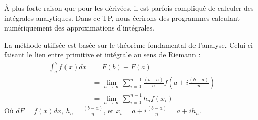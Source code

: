 
À plus forte raison que pour les dérivées, il est parfois compliqué de calculer
des intégrales analytiques. Dans ce TP, nous écrirons des programmes
calculant numériquement des approximations d'intégrales.

La méthode utilisée est basée sur le théorème fondamental de l'analyse.
Celui-ci faisant le lien entre primitive et intégrale au sens de Riemann :
\begin{equation}
\begin{split}
\int_a^b f(x)dx &= F(b)-F(a) \\
                &= \lim_{n\rightarrow\infty} \sum_{i=0}^{n-1}\frac{(b-a)}{n} f(a+i\frac{(b-a)}{n})\\
                &= \lim_{n\rightarrow\infty} \sum_{i=0}^{n-1} h_n f(x_i)
\end{split}
\end{equation}
Où $dF = f(x)dx$, $h_n=\frac{(b-a)}{n}$, et $x_i=a+ i\frac{(b-a)}{n} = a+ih_n$.

\begin{center}
\end{center}

